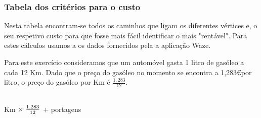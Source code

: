 \documentclass[12pt]{article}
\begin{document}
    \newpage
    
    \subsubsection{Tabela dos critérios para o custo}
    \noindent Nesta tabela encontram-se todos os caminhos que ligam os diferentes vértices e, o seu respetivo custo para que fosse mais fácil identificar o mais "rentável". Para estes cálculos usamos a os dados fornecidos pela a aplicação Waze.\newline
    
    \noindent Para este exercício consideramos que um automóvel gasta 1 litro de gasóleo a cada 12 Km. Dado que o preço do gasóleo no  momento se encontra a 1,283\euro \hspace{1mm}por litro, o preço do gasóleo por Km é \( \frac{1,283}{12}\).\\\\
    \begin{center}
        Km \(\times \hspace{1mm} \frac{1,283}{12}\) + portagens\\
    \end{center} 
    
\end{document}

